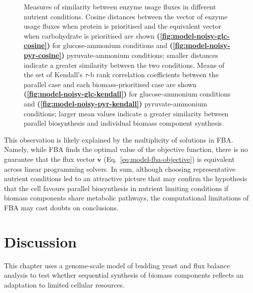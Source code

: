 \begin{figure}[htb!]
  \caption[
    Measures of similarity between enzyme usage fluxes in different nutrient conditions
  ]{
    Measures of similarity between enzyme usage fluxes in different nutrient conditions.
    Cosine distances between the vector of enzyme usage fluxes when protein is prioritised and the equivalent vector when carbohydrate is prioritised are shown \textbf{(\ref{fig:model-noisy-glc-cosine})} for glucose-ammonium conditions and \textbf{(\ref{fig:model-noisy-pyr-cosine})} pyruvate-ammonium conditions; smaller distances indicate a greater similarity between the two conditions.
    Means of the set of Kendall's $\tau$-b rank correlation coefficients between the parallel case and each biomass-prioritised case are shown \textbf{(\ref{fig:model-noisy-glc-kendall})} for glucose-ammonium conditions and \textbf{(\ref{fig:model-noisy-pyr-kendall})} pyruvate-ammonium conditions; larger mean values indicate a greater similarity between parallel biosynthesis and individual biomass component synthesis.
    }
  \label{fig:model-noisy}
\end{figure}

This observation is likely explained by the multiplicity of solutions in FBA\@.
Namely, while FBA finds the optimal value of the objective function, there is no guarantee that the flux vector $\mathbf{v}$ (Eq.\ \ref{eq:model-fba-objective}) is equivalent across linear programming solvers.
In sum, although choosing representative nutrient conditions led to an attractive picture that may confirm the hypothesis that the cell favours parallel biosynthesis in nutrient limiting conditions if biomass components share metabolic pathways, the computational limitations of FBA may cast doubts on conclusions.


\section{Discussion}
\label{subsec:model-discussion}

This chapter uses a genome-scale model of budding yeast and flux balance analysis to test whether sequential synthesis of biomass components reflects an adaptation to limited cellular resources.

